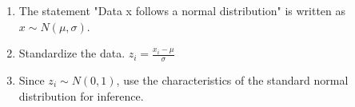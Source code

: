 \begin{enumerate}
	\item The statement "Data x follows a normal distribution" is written as $x \sim N(\mu,\sigma)$.
	\item Standardize the data. $z_i = \frac{x_i - \mu}{\sigma}$
	\item Since $z_i \sim N(0,1)$, use the characteristics of the standard normal distribution for inference.
\end{enumerate}
